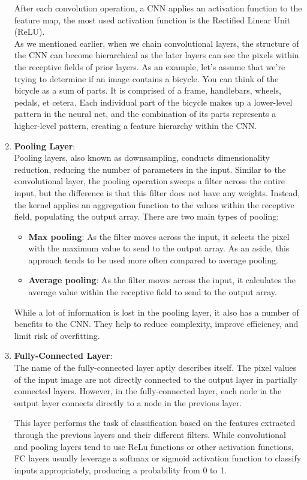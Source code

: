 \begin{enumerate}
        After each convolution operation, a CNN applies an activation function to the feature map, the most used activation function is the Rectified Linear Unit (ReLU).\\
        As we mentioned earlier, when we chain convolutional layers, the structure of the CNN can become hierarchical as the later layers can see the pixels within the receptive fields of prior layers.  As an example, let’s assume that we’re trying to determine if an image contains a bicycle. You can think of the bicycle as a sum of parts. It is comprised of a frame, handlebars, wheels, pedals, et cetera. Each individual part of the bicycle makes up a lower-level pattern in the neural net, and the combination of its parts represents a higher-level pattern, creating a feature hierarchy within the CNN.
    \item \textbf{Pooling Layer}:\\
        Pooling layers, also known as downsampling, conducts dimensionality reduction, reducing the number of parameters in the input. Similar to the convolutional layer, the pooling operation sweeps a filter across the entire input, but the difference is that this filter does not have any weights. Instead, the kernel applies an aggregation function to the values within the receptive field, populating the output array. There are two main types of pooling:
        \begin{itemize}
            \item \textbf{Max pooling}: As the filter moves across the input, it selects the pixel with the maximum value to send to the output array. As an aside, this approach tends to be used more often compared to average pooling.
            \item \textbf{Average pooling}: As the filter moves across the input, it calculates the average value within the receptive field to send to the output array.
        \end{itemize}
        
        While a lot of information is lost in the pooling layer, it also has a number of benefits to the CNN. They help to reduce complexity, improve efficiency, and limit risk of overfitting.
    
    \item \textbf{Fully-Connected Layer}:\\
        The name of the fully-connected layer aptly describes itself. The pixel values of the input image are not directly connected to the output layer in partially connected layers. However, in the fully-connected layer, each node in the output layer connects directly to a node in the previous layer.

        This layer performs the task of classification based on the features extracted through the previous layers and their different filters. While convolutional and pooling layers tend to use ReLu functions or other activation functions, FC layers usually leverage a softmax or sigmoid activation function to classify inputs appropriately, producing a probability from 0 to 1.
        
\end{enumerate}


